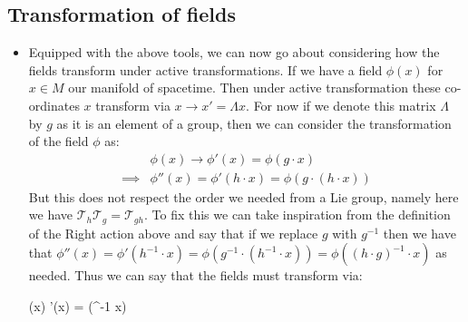 \documentclass[11pt]{article}
\renewenvironment{flalign}{\vspace{-3mm}\empheq[box=\tcbhighmath]{align}}{\endempheq}
\numberwithin{equation}{section}
\begin{document}
     \subsection{Transformation of fields}
     \begin{itemize}
       \item Equipped with the above tools, we can now go about considering how the fields transform under active transformations. If we have a field $\phi(x)$ for $x \in M$ our manifold of spacetime. Then under active transformation these co-ordinates $x$ transform via $x \rightarrow x' = \Lambda x$. For now if we denote this matrix $\Lambda$ by $g$ as it is an element of a group, then we can consider the transformation of the field $\phi$ as:
       \vspace{-2mm}
       \begin{align*}
       & \phi(x) \rightarrow \phi'(x) = \phi(g \cdot x) \\ 
       \implies & \phi''(x) = \phi'(h\cdot x) = \phi(g\cdot (h \cdot x)) 
       \end{align*}
       But this does not respect the order we needed from a Lie group, namely here we have $\mathcal{T}_{h}\mathcal{T}_{g}=\mathcal{T}_{gh}$. To fix this we can take inspiration from the definition of the Right action above and say that if we replace $g$ with $g^{-1}$ then we have that $\phi''(x) = \phi'(h^{-1}\cdot x) = \phi(g^{-1}\cdot (h^{-1} \cdot x)) = \phi((h\cdot g)^{-1} \cdot x)$ as needed. Thus we can say that the fields must transform via:

       \begin{flalign}
       \label{phi_transform}
       \phi(x) \rightarrow \phi'(x) = \phi(\Lambda^{-1} \cdot x)
       \end{flalign}
     \end{itemize}
\end{document}
